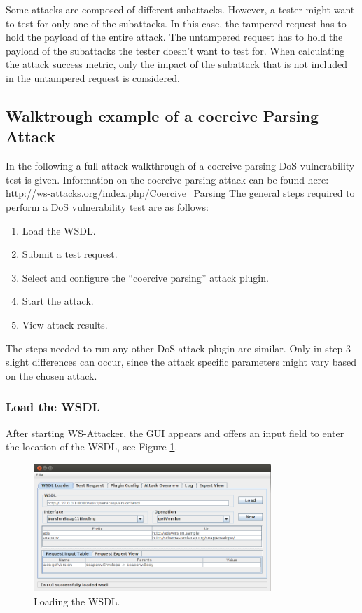 Some attacks are composed of different subattacks. However, a tester might want to test for only one of the subattacks. 
In this case, the tampered request has to hold the payload of the entire attack. The untampered request has to hold the payload of the subattacks the tester doesn’t want to test for. 
When calculating the attack success metric, only the impact of the subattack that is not included in the untampered request is considered.



\subsection{Walktrough example of a coercive Parsing Attack}
\label{sec:walkthrough_example}

In the following a full attack walkthrough of a coercive parsing DoS vulnerability test is given. Information on the coercive parsing attack can be found here: \url{http://ws-attacks.org/index.php/Coercive_Parsing}
The general steps required to perform a DoS vulnerability test are as follows: 
\begin{enumerate}
    \item Load the WSDL.
    \item Submit a test request.
    \item Select and configure the ``coercive parsing'' attack plugin.
    \item Start the attack.
    \item View attack results.
\end{enumerate}

The steps needed to run any other DoS attack plugin are similar. 
Only in step 3 slight differences can occur, since the attack specific parameters might vary based on the chosen attack.


\subsubsection{Load the WSDL}
\label{sec:loading_a_wsdl}

After starting WS-Attacker, the GUI appears and offers an input field to enter the location
of the WSDL, see Figure \ref{fig:dosStep1}.

\begin{figure}[h!]
    \begin{center}
        \includegraphics[width=0.8\textwidth]{img/dosStep1}
    \end{center}
    \caption{Loading the WSDL.}
    \label{fig:dosStep1}
\end{figure}

